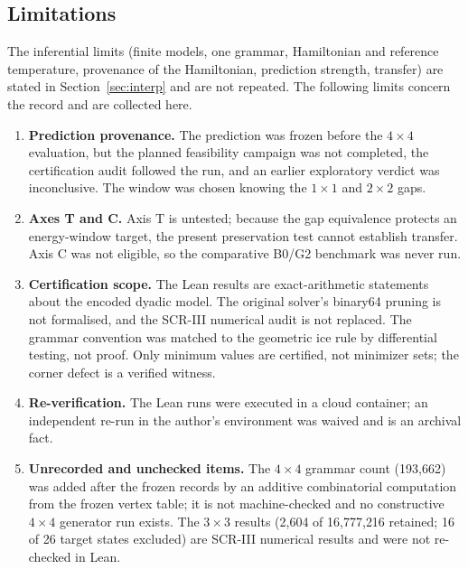 \documentclass[11pt,a4paper]{article}
\theoremstyle{plain}
\theoremstyle{definition}
\theoremstyle{remark}
\begin{document}
\subsection{Limitations}
The inferential limits (finite models, one grammar, Hamiltonian and reference temperature, provenance of the Hamiltonian, prediction strength, transfer) are stated in Section~\ref{sec:interp} and are not repeated. The following limits concern the record and are collected here.
\begin{enumerate}
\item \textbf{Prediction provenance.} The prediction was frozen before the $4\times4$ evaluation, but the planned feasibility campaign was not completed, the certification audit followed the run, and an earlier exploratory verdict was inconclusive. The window was chosen knowing the $1\times1$ and $2\times2$ gaps.
\item \textbf{Axes T and C.} Axis T is untested; because the gap equivalence protects an energy-window target, the present preservation test cannot establish transfer. Axis C was not eligible, so the comparative B0/G2 benchmark was never run.
\item \textbf{Certification scope.} The Lean results are exact-arithmetic statements about the encoded dyadic model. The original solver's binary64 pruning is not formalised, and the SCR-III numerical audit is not replaced. The grammar convention was matched to the geometric ice rule by differential testing, not proof. Only minimum values are certified, not minimizer sets; the corner defect is a verified witness.
\item \textbf{Re-verification.} The Lean runs were executed in a cloud container; an independent re-run in the author's environment was waived and is an archival fact.
\item \textbf{Unrecorded and unchecked items.} The $4\times4$ grammar count (193{,}662) was added after the frozen records by an additive combinatorial computation from the frozen vertex table; it is not machine-checked and no constructive $4\times4$ generator run exists. The $3\times3$ results (2{,}604 of 16{,}777{,}216 retained; 16 of 26 target states excluded) are SCR-III numerical results and were not re-checked in Lean.
\end{enumerate}
\end{document}
